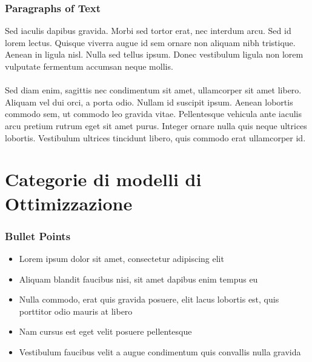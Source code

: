 \documentclass{beamer}
\begin{document}
\begin{frame}
\frametitle{Paragraphs of Text}
Sed iaculis dapibus gravida. Morbi sed tortor erat, nec interdum arcu. Sed id lorem lectus. Quisque viverra augue id sem ornare non aliquam nibh tristique. Aenean in ligula nisl. Nulla sed tellus ipsum. Donec vestibulum ligula non lorem vulputate fermentum accumsan neque mollis.\\~\\

Sed diam enim, sagittis nec condimentum sit amet, ullamcorper sit amet libero. Aliquam vel dui orci, a porta odio. Nullam id suscipit ipsum. Aenean lobortis commodo sem, ut commodo leo gravida vitae. Pellentesque vehicula ante iaculis arcu pretium rutrum eget sit amet purus. Integer ornare nulla quis neque ultrices lobortis. Vestibulum ultrices tincidunt libero, quis commodo erat ullamcorper id.
\end{frame}


\section{Categorie di modelli di Ottimizzazione}


\begin{frame}
	\frametitle{Bullet Points}
	\begin{itemize}
		\item Lorem ipsum dolor sit amet, consectetur adipiscing elit
		\item Aliquam blandit faucibus nisi, sit amet dapibus enim tempus eu
		\item Nulla commodo, erat quis gravida posuere, elit lacus lobortis est, quis porttitor odio mauris at libero
		\item Nam cursus est eget velit posuere pellentesque
		\item Vestibulum faucibus velit a augue condimentum quis convallis nulla gravida
	\end{itemize}
\end{frame}

\end{document}
